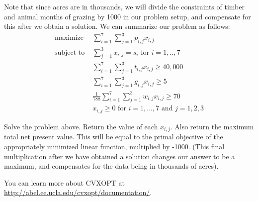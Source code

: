 Note that since acres are in thousands, we will divide the constraints of timber and animal months of grazing by 1000 in our problem setup, and compensate for this after we obtain a solution. We can summarize our problem as follows:
\begin{align*}
\text{maximize } &\sum\limits_{i=1}^7 \sum\limits_{j=1}^3 p_{i,j}x_{i,j} \\
\text{subject to } &\sum\limits_{j=1}^3 x_{i,j} = s_i  \text{ for } i=1,..,7 \\
	        &\sum\limits_{i=1}^7 \sum\limits_{j=1}^3 t_{i,j}x_{i,j} \geq 40,000 \\
		&\sum\limits_{i=1}^7 \sum\limits_{j=1}^3 g_{i,j}x_{i,j} \geq 5 \\
		&\frac{1}{788} \sum\limits_{i=1}^7 \sum\limits_{j=1}^3 w_{i,j}x_{i,j} \geq 70 \\
		&x_{i,j} \geq 0 \text{ for } i=1,...,7  \text{ and } j=1,2,3
\end{align*}

\begin{problem}
Solve the problem above. Return the value of each $x_{i,j}$. 
Also return the maximum total net present value. This will be equal to the primal objective of the appropriately minimized linear function, multiplied by -1000. (This final multiplication after we have obtained a solution changes our answer to be a maximum, and compensates for the data being in thousands of acres).
\end{problem} 

You can learn more about CVXOPT at
\url{http://abel.ee.ucla.edu/cvxopt/documentation/}.
